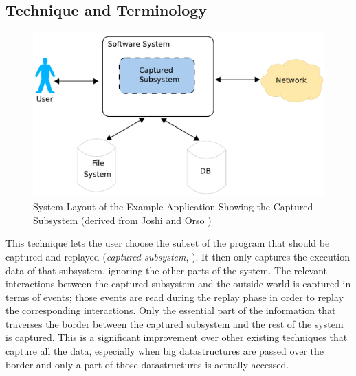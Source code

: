 \subsection{Technique and Terminology}

\begin{figure}[ht]
  \centering
  \includegraphics[width=1\textwidth]{illustrations/scr_overall_schema}
  \caption{System Layout of the Example Application Showing the Captured Subsystem (derived from Joshi and Orso \cite{orso05may})}
  \label{fig:scr_overall_schema}
\end{figure}

This technique lets the user choose the subset of the program that should be captured and replayed (\emph{captured subsystem}, ). It then only captures the execution data of that subsystem, ignoring the other parts of the system. The relevant interactions between the captured subsystem and the outside world is captured in terms of events; those events are read during the replay phase in order to replay the corresponding interactions. Only the essential part of the information that traverses the border between the captured subsystem and the rest of the system is captured. This is a significant improvement over other existing techniques that capture all the data, especially when big datastructures are passed over the border and only a part of those datastructures is actually accessed.

